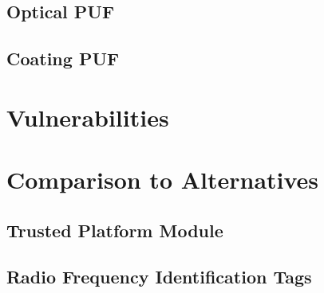 \subsection{Optical PUF}

\subsection{Coating PUF}





\section{Vulnerabilities}


\section{Comparison to Alternatives}

\subsection{Trusted Platform Module}

\subsection{Radio Frequency Identification Tags}

